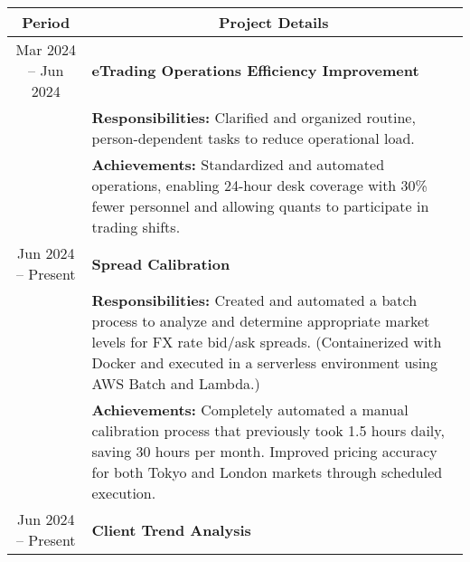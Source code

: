 \documentclass[uplatex,a4j,10.5pt,dvipdfmx]{jsarticle}
\begin{document}
\begin{longtable}{|c|p{14cm}|}
	\hline
	\multicolumn{1}{|c|}{\textbf{Period}} & \multicolumn{1}{c|}{\textbf{Project Details}}                                                                                                                                                                                                                           \\
	\hline
	\endhead

	\hline
	Mar 2024 -- Jun 2024                  & \textbf{\textbullet{} eTrading Operations Efficiency Improvement}                                                                                                                                                                                                       \\
	                                      & {\small \textbf{Responsibilities:}} Clarified and organized routine, person-dependent tasks to reduce operational load.                                                                                                                                                 \\
	                                      & {\small \textbf{Achievements:}} Standardized and automated operations, enabling 24-hour desk coverage with 30\% fewer personnel and allowing quants to participate in trading shifts.                                                                                   \\
	\hline
	Jun 2024 -- Present                   & \textbf{\textbullet{} Spread Calibration}                                                                                                                                                                                                                               \\
	                                      & {\small \textbf{Responsibilities:}} Created and automated a batch process to analyze and determine appropriate market levels for FX rate bid/ask spreads. (Containerized with Docker and executed in a serverless environment using AWS Batch and Lambda.)              \\
	                                      & {\small \textbf{Achievements:}} Completely automated a manual calibration process that previously took 1.5 hours daily, saving 30 hours per month. Improved pricing accuracy for both Tokyo and London markets through scheduled execution.                             \\
	\hline
	Jun 2024 -- Present                   & \textbf{\textbullet{} Client Trend Analysis}                                                                                                                                                                                                                            \\

\end{longtable}
\end{document}
